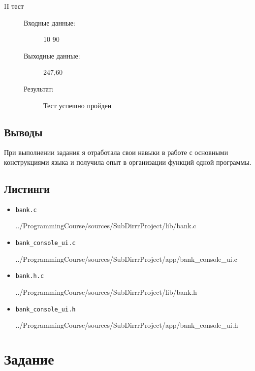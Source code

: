 \documentclass[12pt,a4paper]{report}
\begin{document}
\begin{enumerate}
\begin{description}
\item[II тест]
\hspace{\parindent}
\begin{flushleft}
\begin{description}
\item[Входные данные:] 10 90
\item[Выходные данные:] 247,60
\item[Результат:] Тест успешно пройден
\end{description}
\end{flushleft}
\end{description}

\end{enumerate}

\subsection{Выводы}
\hspace{\parindent}
При выполнении задания я отработала свои навыки в работе с основными конструкциями языка и получила опыт в организации функций одной программы.
\subsection*{Листинги}
\begin{itemize}
\item[] \verb-bank.c-

{../ProgrammingCourse/sources/SubDirrrProject/lib/bank.c}
\item[] \verb-bank_console_ui.c-

{../ProgrammingCourse/sources/SubDirrrProject/app/bank_console_ui.c}
\item[] \verb-bank.h.c-

{../ProgrammingCourse/sources/SubDirrrProject/lib/bank.h}
\item[] \verb-bank_console_ui.h-

{../ProgrammingCourse/sources/SubDirrrProject/app/bank_console_ui.h}
\end{itemize}

%

\section{Задание}
\end{document}
